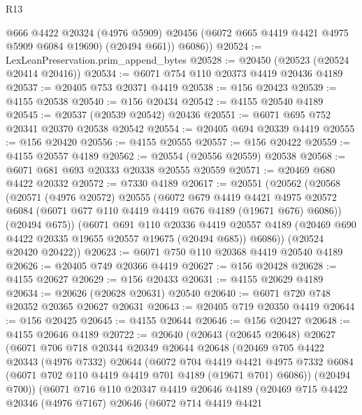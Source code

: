 \begin{lexlean}{R13}
\begin{coremodule}
          @666
          @4422
          @20324
          (@4976 @5909)
          @20456
          (@6072 @665 @4419 @4421 @4975 @5909 @6084 @19690)
          (@20494 @661))
        @6086))
@20524 := LexLeanPreservation.prim_append_bytes
@20528 := @20450 (@20523 (@20524 @20414 @20416))
@20534 := @6071 @754 @110 @20373 @4419 @20436 @4189
@20537 := @20405 @753 @20371 @4419
@20538 := @156 @20423
@20539 := @4155 @20538
@20540 := @156 @20434
@20542 := @4155 @20540 @4189
@20545 := @20537 (@20539 @20542) @20436
@20551 := @6071 @695 @752 @20341 @20370 @20538 @20542
@20554 := @20405 @694 @20339 @4419
@20555 := @156 @20420
@20556 := @4155 @20555
@20557 := @156 @20422
@20559 := @4155 @20557 @4189
@20562 := @20554 (@20556 @20559) @20538
@20568 := @6071 @681 @693 @20333 @20338 @20555 @20559
@20571 := @20469 @680 @4422 @20332
@20572 := @7330 @4189
@20617 := @20551
    (@20562
      (@20568
        (@20571
          (@4976 @20572)
          @20555
          (@6072
            @679
            @4419
            @4421
            @4975
            @20572
            @6084
            (@6071 @677 @110 @4419 @4419 @676 @4189 (@19671 @676) @6086))
          (@20494 @675))
        (@6071
          @691
          @110
          @20336
          @4419
          @20557
          @4189
          (@20469 @690 @4422 @20335 @19655 @20557 @19675 (@20494 @685))
          @6086))
      (@20524 @20420 @20422))
@20623 := @6071 @750 @110 @20368 @4419 @20540 @4189
@20626 := @20405 @749 @20366 @4419
@20627 := @156 @20428
@20628 := @4155 @20627
@20629 := @156 @20433
@20631 := @4155 @20629 @4189
@20634 := @20626 (@20628 @20631) @20540
@20640 := @6071 @720 @748 @20352 @20365 @20627 @20631
@20643 := @20405 @719 @20350 @4419
@20644 := @156 @20425
@20645 := @4155 @20644
@20646 := @156 @20427
@20648 := @4155 @20646 @4189
@20722 := @20640
    (@20643
      (@20645 @20648)
      @20627
      (@6071
        @706
        @718
        @20344
        @20349
        @20644
        @20648
        (@20469
          @705
          @4422
          @20343
          (@4976 @7332)
          @20644
          (@6072
            @704
            @4419
            @4421
            @4975
            @7332
            @6084
            (@6071 @702 @110 @4419 @4419 @701 @4189 (@19671 @701) @6086))
          (@20494 @700))
        (@6071
          @716
          @110
          @20347
          @4419
          @20646
          @4189
          (@20469
            @715
            @4422
            @20346
            (@4976 @7167)
            @20646
            (@6072
              @714
              @4419
              @4421

\end{coremodule}
\end{lexlean}
